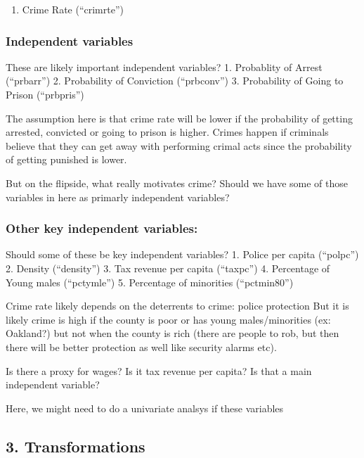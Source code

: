\documentclass[]{article}
\providecommand{\tightlist}{%
  \setlength{\itemsep}{0pt}\setlength{\parskip}{0pt}}
\begin{document}
\begin{enumerate}
\def\labelenumi{\arabic{enumi}.}
\tightlist
\item
  Crime Rate (``crimrte'')
\end{enumerate}

\subsubsection{Independent variables}\label{independent-variables}

These are likely important independent variables? 1. Probablity of
Arrest (``prbarr'') 2. Probability of Conviction (``prbconv'') 3.
Probability of Going to Prison (``prbpris'')

The assumption here is that crime rate will be lower if the probability
of getting arrested, convicted or going to prison is higher. Crimes
happen if criminals believe that they can get away with performing
crimal acts since the probability of getting punished is lower.

But on the flipside, what really motivates crime? Should we have some of
those variables in here as primarly independent variables?

\subsubsection{Other key independent
variables:}\label{other-key-independent-variables}

Should some of these be key independent variables? 1. Police per capita
(``polpc'') 2. Density (``density'') 3. Tax revenue per capita
(``taxpc'') 4. Percentage of Young males (``pctymle'') 5. Percentage of
minorities (``pctmin80'')

Crime rate likely depends on the deterrents to crime: police protection
But it is likely crime is high if the county is poor or has young
males/minorities (ex: Oakland?) but not when the county is rich (there
are people to rob, but then there will be better protection as well like
security alarms etc).

Is there a proxy for wages? Is it tax revenue per capita? Is that a main
independent variable?

Here, we might need to do a univariate analsys if these variables

\subsection{3. Transformations}\label{transformations}
\end{document}
